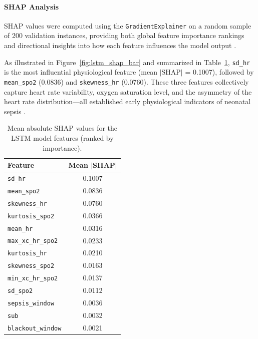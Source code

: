 \documentclass[conference]{IEEEtran}
\begin{document}
\paragraph{SHAP Analysis}

SHAP values were computed using the \texttt{GradientExplainer} on 
a random sample of 200 validation instances, providing both global 
feature importance rankings and directional insights into how each 
feature influences the model output \cite{Nemati2018Interpretable}.

As illustrated in Figure~\ref{fig:lstm_shap_bar} and summarized in 
Table~\ref{tab:lstm_shap_features}, \texttt{sd\_hr} is the most 
influential physiological feature (mean $|$SHAP$|$ = 0.1007), 
followed by \texttt{mean\_spo2} (0.0836) and \texttt{skewness\_hr} 
(0.0760). These three features collectively capture heart rate 
variability, oxygen saturation level, and the asymmetry of the 
heart rate distribution—all established early physiological 
indicators of neonatal sepsis 
\cite{hero_monitoring,vital_sign_ml,Shashikumar2017EarlySepsis}.

\begin{table}[H]
\centering
\caption{Mean absolute SHAP values for the LSTM model features 
(ranked by importance).}
\label{tab:lstm_shap_features}
\renewcommand{\arraystretch}{1.2}
\begin{tabular}{|l|c|}
\hline
\textbf{Feature} & \textbf{Mean $|$SHAP$|$} \\
\hline
\texttt{sd\_hr}            & 0.1007 \\
\hline
\texttt{mean\_spo2}        & 0.0836 \\
\hline
\texttt{skewness\_hr}      & 0.0760 \\
\hline
\texttt{kurtosis\_spo2}    & 0.0366 \\
\hline
\texttt{mean\_hr}          & 0.0316 \\
\hline
\texttt{max\_xc\_hr\_spo2} & 0.0233 \\
\hline
\texttt{kurtosis\_hr}      & 0.0210 \\
\hline
\texttt{skewness\_spo2}    & 0.0163 \\
\hline
\texttt{min\_xc\_hr\_spo2} & 0.0137 \\
\hline
\texttt{sd\_spo2}          & 0.0112 \\
\hline
\texttt{sepsis\_window}    & 0.0036 \\
\hline
\texttt{sub}               & 0.0032 \\
\hline
\texttt{blackout\_window}  & 0.0021 \\
\hline
\end{tabular}
\end{table}
\end{document}
